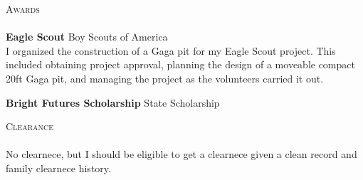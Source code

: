 \documentclass[a4paper]{article}
\newcommand{\lineunder} {
    \vspace*{-8pt} \\
    \hspace*{-18pt} \hrulefill \\
}
\newcommand{\header} [1] {
    {\hspace*{-18pt}\vspace*{6pt} \textsc{#1}}
    \vspace*{-6pt} \lineunder
}
\begin{document}
	
	
	\vspace{2mm}

	\header{Awards}
	\vspace*{1mm}
	\textbf{Eagle Scout} \hfill Boy Scouts of America\\
	I organized the construction of a Gaga pit for my Eagle Scout 
	project. This included obtaining project approval, planning the design of a moveable 
	compact 20ft Gaga pit, and managing the project as the volunteers 
	carried it out.
	\vspace*{2mm}

	\textbf{Bright Futures Scholarship} \hfill State Scholarship \\
	\vspace*{2mm}

	\header{Clearance}
	No clearnece, but I should be eligible to get a clearnece given a clean record
	and family clearnece history.
\end{document}
